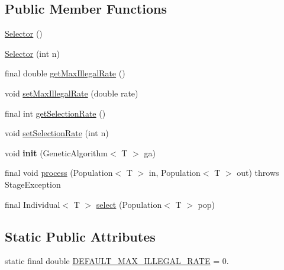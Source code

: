 \subsection*{Public Member Functions}
\begin{DoxyCompactItemize}
\item 
\hyperlink{classjenes_1_1stage_1_1operator_1_1_selector_3_01_t_01extends_01_chromosome_01_4_a83052368d6df966944bc5178f1eebed0}{Selector} ()
\item 
\hyperlink{classjenes_1_1stage_1_1operator_1_1_selector_3_01_t_01extends_01_chromosome_01_4_a07f05455c1fabfb8ad3f6468a653aed8}{Selector} (int n)
\item 
final double \hyperlink{classjenes_1_1stage_1_1operator_1_1_selector_3_01_t_01extends_01_chromosome_01_4_a6e6f7842d22da347196a8cd772bea0e1}{get\-Max\-Illegal\-Rate} ()
\item 
void \hyperlink{classjenes_1_1stage_1_1operator_1_1_selector_3_01_t_01extends_01_chromosome_01_4_a68ffd7e37d617f2f71628ce3659a8457}{set\-Max\-Illegal\-Rate} (double rate)
\item 
final int \hyperlink{classjenes_1_1stage_1_1operator_1_1_selector_3_01_t_01extends_01_chromosome_01_4_a17809883b498ec5764c5aa38d04bda8b}{get\-Selection\-Rate} ()
\item 
void \hyperlink{classjenes_1_1stage_1_1operator_1_1_selector_3_01_t_01extends_01_chromosome_01_4_aa67094343d09f80b0ce35d0f20a517d5}{set\-Selection\-Rate} (int n)
\item 
\hypertarget{classjenes_1_1stage_1_1operator_1_1_selector_3_01_t_01extends_01_chromosome_01_4_a780969225a2e48774e71af8bd4e0063e}{void {\bfseries init} (Genetic\-Algorithm$<$ T $>$ ga)}\label{classjenes_1_1stage_1_1operator_1_1_selector_3_01_t_01extends_01_chromosome_01_4_a780969225a2e48774e71af8bd4e0063e}

\item 
final void \hyperlink{classjenes_1_1stage_1_1operator_1_1_selector_3_01_t_01extends_01_chromosome_01_4_a11275bed8b009ece669a5c88c6e10b55}{process} (Population$<$ T $>$ in, Population$<$ T $>$ out)  throws Stage\-Exception 
\item 
final Individual$<$ T $>$ \hyperlink{classjenes_1_1stage_1_1operator_1_1_selector_3_01_t_01extends_01_chromosome_01_4_a9ef7b0bef2ffcb84eeb231ae37ab0239}{select} (Population$<$ T $>$ pop)
\end{DoxyCompactItemize}
\subsection*{Static Public Attributes}
\begin{DoxyCompactItemize}
\item 
static final double \hyperlink{classjenes_1_1stage_1_1operator_1_1_selector_3_01_t_01extends_01_chromosome_01_4_a81263464a18d2ee1ecddf41f2e97fd89}{D\-E\-F\-A\-U\-L\-T\-\_\-\-M\-A\-X\-\_\-\-I\-L\-L\-E\-G\-A\-L\-\_\-\-R\-A\-T\-E} = 0.
\end{DoxyCompactItemize}
